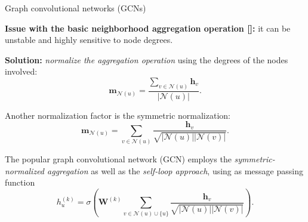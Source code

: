 \documentclass[10pt, aspectratio=169, compress, protectframetitle, handout]{beamer}
\begin{document}
\begin{frame}{Graph convolutional networks (GCNs)}

    \textbf{Issue with the basic neighborhood aggregation operation []:} it can be \alert{unstable} and \alert{highly sensitive to node degrees}.
    
    \textbf{Solution:} \emph{normalize the aggregation operation} using the degrees of the nodes involved:
    \begin{equation}
        \mathbf m_{\mathcal N(u)} = \frac{\sum_{v \in \mathcal N(u)} \mathbf h_v}{|\mathcal N(u)|}.
    \end{equation}
    
    Another normalization factor is the \alert{symmetric normalization}:
    \begin{equation}
        \mathbf m_{\mathcal N(u)} = \sum_{v \in \mathcal N(u)} \frac{\mathbf h_v}{\sqrt{|\mathcal N(u)| |\mathcal N(v)|}}.
    \end{equation}
    
    The popular \alert{graph convolutional network (GCN)} employs the \emph{symmetric-normalized aggregation} as well as the \emph{self-loop approach}, using as message passing function
    \begin{equation}
        h^{(k)}_u = \sigma \left( \mathbf W^{(k)} \sum_{v \in \mathcal N(u) \cup \{u\}} \frac{\mathbf h_v}{\sqrt{|\mathcal N(u)| |\mathcal N(v)|}} \right).
    \end{equation}

\end{frame}



    
    
\end{document}
